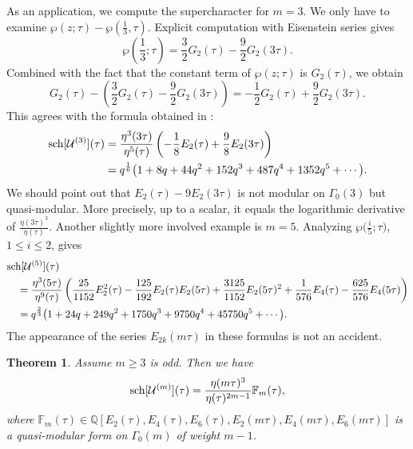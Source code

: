 \documentclass[pdftex]{sigma}
\numberwithin{equation}{section}
\newtheorem{Theorem}{Theorem}[section]
\theoremstyle{definition}
\begin{document}
As an application, we compute the supercharacter for $m=3$.
We only have to examine $\wp(z;\tau)-\wp(\frac{1}{3},\tau)$.
Explicit computation with Eisenstein series gives
\[
\wp\left(\frac13;\tau\right)=\frac32G_2(\tau)-\frac{9}{2}G_2(3 \tau).
\]
Combined with the fact that the constant term of $\wp(z;\tau)$ is $G_2(\tau)$, we obtain
\[
G_2(\tau)-(\frac32G_2(\tau)-\frac{9}{2}G_2(3 \tau) )=-\frac12 G_2(\tau)+\frac92 G_2(3 \tau).
\]
This agrees with the formula obtained in \cite{AM}:
\begin{align*}
{\rm sch}[\mathcal{U}^{(3)}](\tau)&=\frac{\eta^{3}(3 \tau)}{\eta^5(\tau)}\left(-\frac{1}{8}E_{2}(\tau)+\frac98 E_{2}(3 \tau)\right) \\
&=q^{\frac16}\bigl(1+8q+44q^2+152q^3+487q^4+1352q^5+\cdots\bigr).
\end{align*}
We should point out that $E_{2}(\tau)-9 E_{2}(3 \tau)$ is not modular on $\Gamma_0(3)$ but quasi-modular. More precisely, up to a scalar, it equals the logarithmic
derivative of $\frac{\eta(3 \tau)^3}{\eta(\tau)}$.
Another slightly more involved example is $m=5$. Analyzing $\wp\bigl(\frac{i}{5};\tau\bigr)$, $ 1\leq i \leq 2$, gives
\begin{align*}
&{\rm sch}[\mathcal{U}^{(5)}](\tau) \\
&\quad= \frac{\eta^{3}(5 \tau)}{\eta^9(\tau)}\left( \frac{25}{1152} E^2_{2}(\tau)- \frac{125}{192} E_{2}(\tau) E_2(5 \tau) +\frac{3125}{1152} E_2(5 \tau)^2 +\frac{1}{576}
E_4(\tau)-\frac{625}{576}E_4(5 \tau) \right) \\
 & \quad =q^{\frac23}\bigl(1 + 24 q + 249 q^2 + 1750 q^3 + 9750 q^4 + 45750 q^5+ \cdots \bigr).
\end{align*}
The appearance of the series $E_{2k}(m \tau)$ in these formulas is not an accident.
\begin{Theorem} \label{charum} Assume $m\geq3$ is odd. Then we have
\[
{\rm sch}[\mathcal{U}^{(m)}](\tau)= \frac{\eta(m \tau)^3}{\eta(\tau)^{2m-1}} \mathbb{F}_m(\tau),
\]
where $\mathbb{F}_m(\tau) \in \mathbb{Q}[E_2(\tau),E_4(\tau),E_6(\tau),E_2(m \tau),E_4(m \tau),E_6(m \tau)]$ is a quasi-modular form on $\Gamma_0(m)$ of weight $m-1$.
\end{Theorem}
\end{document}
